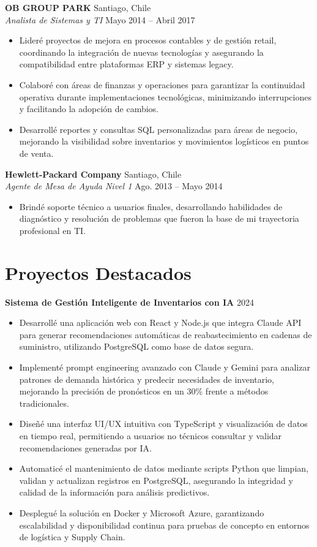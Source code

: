 \documentclass[11pt,letterpaper]{article}
\begin{document}
\vspace{2pt}
\textbf{OB GROUP PARK} \hfill Santiago, Chile\\
\textit{Analista de Sistemas y TI} \hfill Mayo 2014 – Abril 2017
\begin{itemize}
  \item Lideré proyectos de mejora en procesos contables y de gestión retail, coordinando la integración de nuevas tecnologías y asegurando la compatibilidad entre plataformas ERP y sistemas legacy.
  \item Colaboré con áreas de finanzas y operaciones para garantizar la continuidad operativa durante implementaciones tecnológicas, minimizando interrupciones y facilitando la adopción de cambios.
  \item Desarrollé reportes y consultas SQL personalizadas para áreas de negocio, mejorando la visibilidad sobre inventarios y movimientos logísticos en puntos de venta.
\end{itemize}
\vspace{2pt}
\textbf{Hewlett-Packard Company} \hfill Santiago, Chile\\
\textit{Agente de Mesa de Ayuda Nivel 1} \hfill Ago. 2013 – Mayo 2014
\begin{itemize}
  \item Brindé soporte técnico a usuarios finales, desarrollando habilidades de diagnóstico y resolución de problemas que fueron la base de mi trayectoria profesional en TI.
\end{itemize}

\section{Proyectos Destacados}

\textbf{Sistema de Gestión Inteligente de Inventarios con IA} \hfill 2024
\begin{itemize}
  \item Desarrollé una aplicación web con React y Node.js que integra Claude API para generar recomendaciones automáticas de reabastecimiento en cadenas de suministro, utilizando PostgreSQL como base de datos segura.
  \item Implementé prompt engineering avanzado con Claude y Gemini para analizar patrones de demanda histórica y predecir necesidades de inventario, mejorando la precisión de pronósticos en un 30\% frente a métodos tradicionales.
  \item Diseñé una interfaz UI/UX intuitiva con TypeScript y visualización de datos en tiempo real, permitiendo a usuarios no técnicos consultar y validar recomendaciones generadas por IA.
  \item Automaticé el mantenimiento de datos mediante scripts Python que limpian, validan y actualizan registros en PostgreSQL, asegurando la integridad y calidad de la información para análisis predictivos.
  \item Desplegué la solución en Docker y Microsoft Azure, garantizando escalabilidad y disponibilidad continua para pruebas de concepto en entornos de logística y Supply Chain.
\end{itemize}
\end{document}
